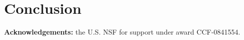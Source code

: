 \documentclass[9pt,natbib]{sigplanconf}
\begin{document}
\section{Conclusion}

\textbf{Acknowledgements:} the U.S. NSF for support under award
CCF-0841554.




\end{document}
